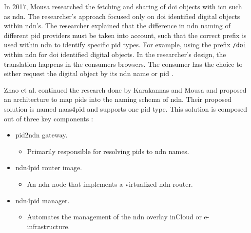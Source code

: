 \documentclass[conference]{IEEEtran}
\begin{document}
In 2017, Mousa researched the fetching and sharing of \gls{doi} objects with \gls{icn} such as \gls{ndn}. The researcher's approach focused only on \gls{doi} identified digital objects within \gls{ndn}'s. The researcher explained that the difference in \gls{ndn} naming of different \gls{pid} providers must be taken into account, such that the correct prefix is used within \gls{ndn} to identify specific \gls{pid} types. For example, using the prefix \texttt{/doi} within \gls{ndn} for \gls{doi} identified digital objects. In the researcher's design, the translation happens in the consumers browsers. The consumer has the choice to either request the digital object by its \gls{ndn} name or \gls{pid} \cite{ndn-app-aware}.

Zhao et al. continued the research done by Karakannas \cite{icn-bd} and Mousa \cite{ndn-app-aware} and proposed an architecture to map \glspl{pid} into the naming schema of \gls{ndn}. Their proposed solution is named \gls{naas4pid} and supports one \gls{pid} type. This solution is composed out of three key components \cite{koulouzis2018information}:
\begin{itemize}
  \item \gls{pid}2\gls{ndn} gateway.
  \begin{itemize}
        \item Primarily responsible for resolving \glspl{pid} to \gls{ndn} names.
  \end{itemize}
  \item \gls{ndn}4\gls{pid} router image.
    \begin{itemize}
        \item An \gls{ndn} node that implements a virtualized \gls{ndn} router.
    \end{itemize}
  \item \gls{ndn}4\gls{pid} manager.
    \begin{itemize}
        \item Automates the management of the \gls{ndn} overlay in\newline Cloud or e-infrastructure.
    \end{itemize}
\end{itemize}
\end{document}
